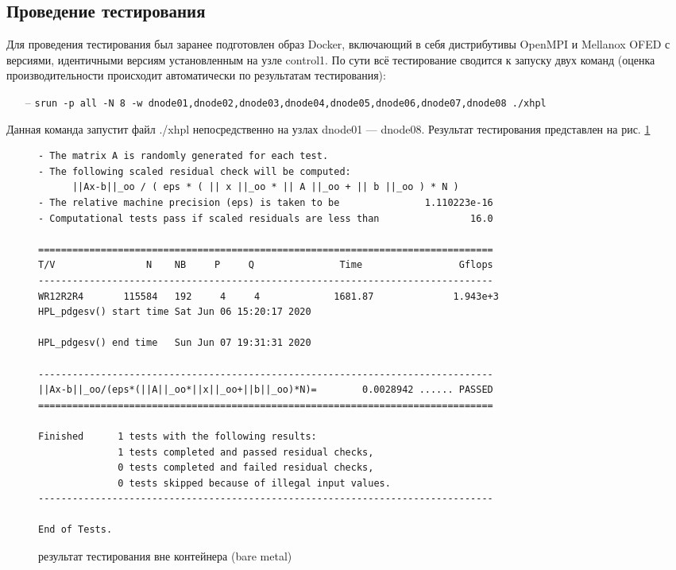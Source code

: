 \documentclass[a4paper]{extarticle}
\begin{document}
\subsection{Проведение тестирования}

Для проведения тестирования был заранее подготовлен образ Docker, включающий в себя дистрибутивы OpenMPI и Mellanox OFED с версиями, идентичными версиям установленным на узле control1. По сути всё тестирование сводится к запуску двух команд (оценка производительности происходит автоматически по результатам тестирования):

\begin{itemize}
\item[--] \verb|srun -p all -N 8 -w dnode01,dnode02,dnode03,dnode04,dnode05,dnode06,dnode07,dnode08 ./xhpl|
\end{itemize}

Данная команда запустит файл ./xhpl непосредственно на узлах dnode01 --- dnode08. Результат тестирования представлен на рис. \ref{fig:hplres1}

\begin{figure}[H]
\begin{verbatim}
- The matrix A is randomly generated for each test.
- The following scaled residual check will be computed:
      ||Ax-b||_oo / ( eps * ( || x ||_oo * || A ||_oo + || b ||_oo ) * N )
- The relative machine precision (eps) is taken to be               1.110223e-16
- Computational tests pass if scaled residuals are less than                16.0

================================================================================
T/V                N    NB     P     Q               Time                 Gflops
--------------------------------------------------------------------------------
WR12R2R4       115584   192     4     4             1681.87              1.943e+3
HPL_pdgesv() start time Sat Jun 06 15:20:17 2020

HPL_pdgesv() end time   Sun Jun 07 19:31:31 2020

--------------------------------------------------------------------------------
||Ax-b||_oo/(eps*(||A||_oo*||x||_oo+||b||_oo)*N)=        0.0028942 ...... PASSED
================================================================================

Finished      1 tests with the following results:
              1 tests completed and passed residual checks,
              0 tests completed and failed residual checks,
              0 tests skipped because of illegal input values.
--------------------------------------------------------------------------------

End of Tests.
\end{verbatim}
\captionsetup{labelfont=bf, labelsep=space}
\caption{результат тестирования вне контейнера (bare metal)}
\label{fig:hplres1}
\end{figure}
\end{document}
